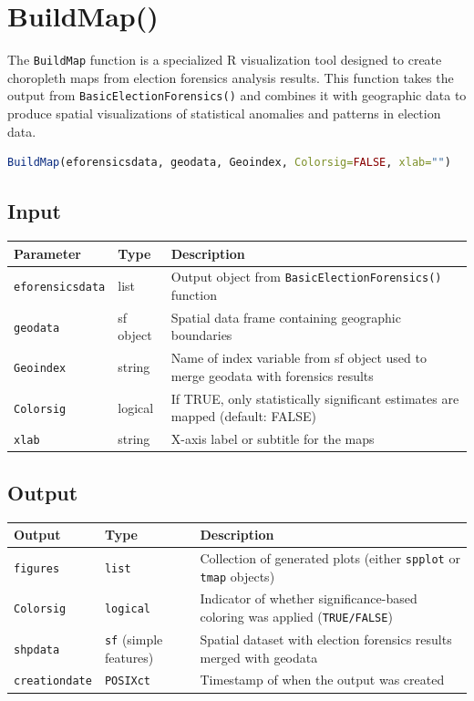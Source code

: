 \documentclass{article}
\begin{document}
\section{BuildMap()}

The \texttt{BuildMap} function is a specialized R visualization tool designed to create choropleth maps from election forensics analysis results. This function takes the output from \texttt{BasicElectionForensics()} and combines it with geographic data to produce spatial visualizations of statistical anomalies and patterns in election data.

\begin{lstlisting}[language=R]
BuildMap(eforensicsdata, geodata, Geoindex, Colorsig=FALSE, xlab="")
\end{lstlisting}

\subsection{Input}
\begin{longtable}{p{3cm}p{3cm}p{8cm}}
\toprule
\textbf{Parameter} & \textbf{Type} & \textbf{Description} \\
\midrule
\texttt{eforensicsdata} & list & Output object from \texttt{BasicElectionForensics()} function \\
\texttt{geodata} & sf object & Spatial data frame containing geographic boundaries \\
\texttt{Geoindex} & string & Name of index variable from sf object used to merge geodata with forensics results \\
\texttt{Colorsig} & logical & If TRUE, only statistically significant estimates are mapped (default: FALSE) \\
\texttt{xlab} & string & X-axis label or subtitle for the maps \\
\bottomrule
\end{longtable}

\subsection{Output}
\begin{longtable}{p{3cm}p{3cm}p{8cm}}
\toprule
\textbf{Output} & \textbf{Type} & \textbf{Description} \\
\midrule
\texttt{figures} & \texttt{list} & Collection of generated plots (either \texttt{spplot} or \texttt{tmap} objects) \\
\texttt{Colorsig} & \texttt{logical} & Indicator of whether significance-based coloring was applied (\texttt{TRUE/FALSE}) \\
\texttt{shpdata} & \texttt{sf} (simple features) & Spatial dataset with election forensics results merged with geodata \\
\texttt{creationdate} & \texttt{POSIXct} & Timestamp of when the output was created \\
\bottomrule
\end{longtable}
\end{document}
